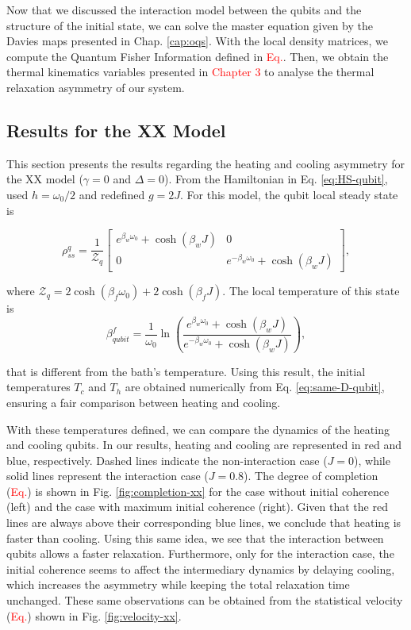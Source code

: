 Now that we discussed the interaction model between the qubits and the structure of the initial state, we can solve the master equation given by the Davies maps presented in Chap. \ref{cap:oqs}. With the local density matrices, we compute the Quantum Fisher Information defined in \textcolor{red}{Eq.}. Then, we obtain the thermal kinematics variables presented in \textcolor{red}{Chapter 3} to analyse the thermal relaxation asymmetry of our system.

\subsection{Results for the XX Model}\label{sec:result-xx}

This section presents the results regarding the heating and cooling asymmetry for the XX model ($\gamma = 0$ and $\Delta = 0$). From the Hamiltonian in Eq. \eqref{eq:HS-qubit}, used $h = \omega_0 / 2$ and redefined $g = 2J$. For this model, the qubit local steady state is

\begin{equation}
    \rho_{ss}^q = \frac{1}{\mathcal{Z}_q}
    \begin{bmatrix}
        e^{\beta_w \omega_0} + \cosh (\beta_w J) & 0\\
        0 & e^{-\beta_w \omega_0} + \cosh (\beta_w J)
    \end{bmatrix},
\end{equation}

\noindent where $\mathcal{Z}_q = 2 \cosh(\beta_f \omega_0) + 2 \cosh(\beta_f J)$. The local temperature of this state is
\begin{equation}
    \beta_{qubit}^{f} = \frac{1}{\omega_0} \ln \left( \frac{e^{\beta_w \omega_0} + \cosh (\beta_w J)}{e^{-\beta_w \omega_0} + \cosh (\beta_w J)} \right),
\end{equation}

\noindent that is different from the bath's temperature. Using this result, the initial temperatures $T_c$ and $T_h$ are obtained numerically from Eq. \eqref{eq:same-D-qubit}, ensuring a fair comparison between heating and cooling.

With these temperatures defined, we can compare the dynamics of the heating and cooling qubits. In our results, heating and cooling are represented in red and blue, respectively. Dashed lines indicate the non-interaction case ($J = 0$), while solid lines represent the interaction case ($J = 0.8$). The degree of completion (\textcolor{red}{Eq.}) is shown in Fig. \ref{fig:completion-xx} for the case without initial coherence (left) and the case with maximum initial coherence (right). Given that the red lines are always above their corresponding blue lines, we conclude that heating is faster than cooling. Using this same idea, we see that the interaction between qubits allows a faster relaxation. Furthermore, only for the interaction case, the initial coherence seems to affect the intermediary dynamics by delaying cooling, which increases the asymmetry while keeping the total relaxation time unchanged. These same observations can be obtained from the statistical velocity (\textcolor{red}{Eq.}) shown in Fig. \ref{fig:velocity-xx}.

